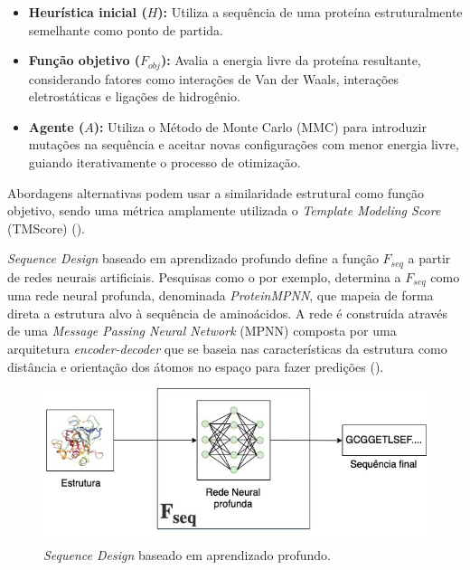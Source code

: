 \begin{itemize}
    \item \textbf{Heurística inicial ($H$):}  
    Utiliza a sequência de uma proteína estruturalmente semelhante como ponto de partida.

    \item \textbf{Função objetivo ($F_{obj}$):}  
    Avalia a energia livre da proteína resultante, considerando fatores como interações de Van der Waals,
    interações eletrostáticas e ligações de hidrogênio.

    \item \textbf{Agente ($A$):}  
    Utiliza o Método de Monte Carlo (MMC) para introduzir mutações na sequência e aceitar novas configurações com menor energia livre,
    guiando iterativamente o processo de otimização.
\end{itemize}

Abordagens alternativas podem usar a similaridade estrutural como função objetivo,
sendo uma métrica amplamente utilizada o \textit{Template Modeling Score} (TMScore) (\cite{tmscore}).

\textit{Sequence Design} baseado em aprendizado profundo define a função $F_{seq}$ 
a partir de redes neurais artificiais. 
Pesquisas como o \cite{ProteinMPNN} por exemplo, 
determina a $F_{seq}$ como uma rede neural profunda, denominada \textit{ProteinMPNN}, 
que mapeia de forma direta a estrutura alvo à sequência de aminoácidos. 
A rede é construída através de uma \textit{Message Passing Neural Network} (MPNN) 
composta por uma arquitetura \textit{encoder-decoder} 
que se baseia nas características da estrutura como distância e orientação dos átomos no espaço 
para fazer predições (\cite{ProteinMPNN}). 

\begin{figure}[H]
  \centering
  \includegraphics[width=.8\textwidth]{figuras/metodologia-DeepLearningBased.jpg}
  \caption{\textit{Sequence Design} baseado em aprendizado profundo.}
\end{figure}

